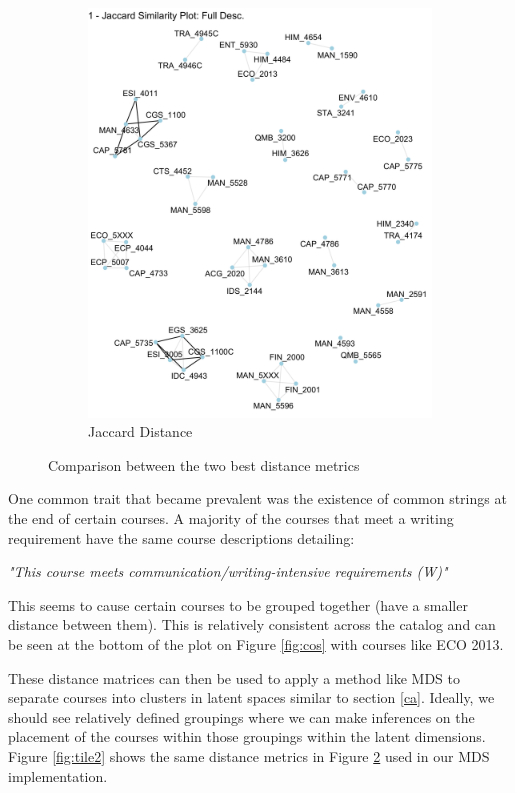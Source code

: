\begin{figure}[H]
\begin{subfigure}{.5\textwidth}
  \includegraphics[width=1\linewidth]{Content/images/jac.png}
  \caption{Jaccard Distance}
  \label{fig:jac}
\end{subfigure}
\caption{Comparison between the two best distance metrics}
\label{fig:tile}
\end{figure}

One common trait that became prevalent was the existence of common strings at the end of certain courses.  A majority of the courses that meet a writing requirement have the same course descriptions detailing:

 \textit{"This course meets communication/writing-intensive requirements (W)"} 
 
This seems to cause certain courses to be grouped together (have a smaller distance between them).  This is relatively consistent across the catalog and can be seen at the bottom of the plot on Figure \ref{fig:cos} with courses like ECO 2013. 

These distance matrices can then be used to apply a method like MDS to separate courses into clusters in latent spaces similar to section \ref{ca}. Ideally, we should see relatively defined groupings where we can make inferences on the placement of the courses within those groupings within the latent dimensions.  Figure \ref{fig:tile2} shows the same distance metrics in Figure \ref{fig:tile} used in our MDS implementation.

